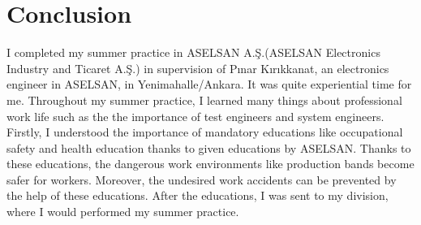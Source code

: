 %      
	
	









\newpage

\section{Conclusion}
\-\indent 
	I completed my summer practice in ASELSAN A.Ş.(ASELSAN Electronics Industry and Ticaret A.Ş.) in supervision of Pınar Kırıkkanat, an electronics engineer in ASELSAN, in Yenimahalle/Ankara. It was quite experiential time for me. Throughout my summer practice, I learned many things about professional work life such as the the importance of test engineers and system engineers. \\

	Firstly, I understood the importance of mandatory educations like occupational safety and health education thanks to given educations by ASELSAN. Thanks to these educations, the dangerous work environments like production bands become safer for workers. Moreover, the undesired work accidents can be prevented by the help of these educations. After the educations, I was  sent to my division, where I would performed my summer practice.\\	
	
